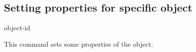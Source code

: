 \begin{arguments}
\end{arguments} 

\subsection{\label{ssec:oif-object-set}Setting properties for specific object}

\begin{essyntax}
  object-id  
  \begin{features}
  \end{features}
\end{essyntax}

This command sets some properties of the object.


